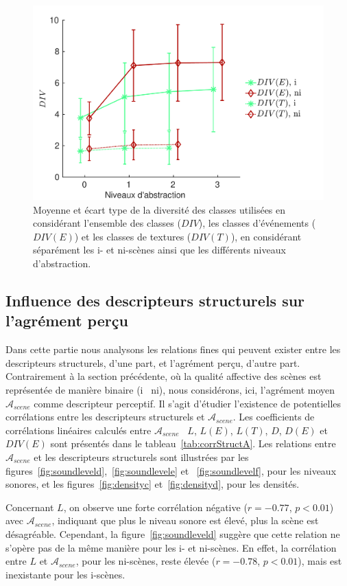 \begin{figure}[t]
        \myfloatalign
        \includegraphics[width=.8\linewidth]{gfx/ch_5/xp1_div_1}
       \caption{Moyenne et écart type de la diversité des classes utilisées en considérant l'ensemble des classes ($DIV$), les classes d'événements ($DIV(E)$) et les classes de textures ($DIV(T)$), en considérant séparément les i- et ni-scènes ainsi que les différents niveaux d'abstraction.}\label{fig:diversity}
\end{figure}

\subsection{Influence des descripteurs structurels sur l'agrément perçu}
\label{sec:ch5_corrDesStruct}

Dans cette partie nous analysons les relations fines qui peuvent exister entre les descripteurs structurels, d'une part, et l'agrément perçu, d'autre part. Contrairement à la section précédente, où la qualité affective des scènes est représentée de manière binaire (i \vs~ni), nous considérons, ici, l'agrément moyen $\mathcal{A}_{scene}$ comme descripteur perceptif. Il s'agit d'étudier l'existence de potentielles corrélations entre les descripteurs structurels et $\mathcal{A}_{scene}$. Les coefficients de corrélations linéaires calculés entre $\mathcal{A}_{scene}$ \vs~$L$, $L(E)$, $L(T)$, $D$, $D(E)$ et $DIV(E)$ sont présentés dans le tableau~\ref{tab:corrStructA}. Les relations entre $\mathcal{A}_{scene}$ et les descripteurs structurels sont illustrées par les figures~\ref{fig:soundleveld},~\ref{fig:soundlevele} et ~\ref{fig:soundlevelf}, pour les niveaux sonores, et les figures~\ref{fig:densityc} et~\ref{fig:densityd}, pour les densités. 

Concernant $L$, on observe une forte corrélation négative ($r=-0.77$, $p<0.01$) avec $\mathcal{A}_{scene}$, indiquant que plus le niveau sonore est élevé, plus la scène est désagréable. Cependant, la figure~\ref{fig:soundleveld} suggère que cette relation ne s'opère pas de la même manière pour les i- et ni-scènes. En effet, la corrélation entre $L$ et $\mathcal{A}_{scene}$, pour les ni-scènes, reste élevée ($r=-0.78$, $p<0.01$), mais est inexistante pour les i-scènes. 

